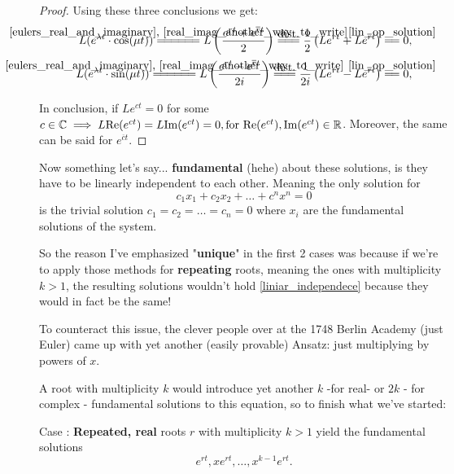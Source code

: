 \begin{proof}
	\newcommand\byDistributivity{\stackrel{\mathclap{\normalfont\mbox{dist.}}}{=\joinrel=\joinrel=}}

	\newcommand\operatorSatisfy{\stackrel{\mathclap{\normalfont\mbox{\ref{lin_op_solution}}}}{=\joinrel=}}

	Using these three conclusions we get:
	\begin{align*}
		L(e^{\lambda t} \cdot \text{cos}(\mu t)) \firstConclusion
		L\left(\frac{e^{rt}+e^{\overline{r}t}}{2} \right) \byDistributivity
		\frac{1}{2} \left( Le^{rt} + Le^{\overline{r}t} \right) \operatorSatisfy 0 , \\
		L(e^{\lambda t} \cdot \text{sin}(\mu t)) \firstConclusion
		L\left(\frac{e^{rt}-e^{\overline{r}t}}{2i} \right) \byDistributivity
		\frac{1}{2i} \left( Le^{rt} - Le^{\overline{r}t} \right) \operatorSatisfy 0 ,
	\end{align*}

	In conclusion, if $Le^{ct}=0$ for some $c \in \mathbb{C} \implies L\text{Re}(e^{ ct })= L\text{Im}(e^{ct})=0, \\
	\text{for } \text{Re}(e^{ct}), \text{Im}(e^{ct}) \in \mathbb{R}$.
	Moreover, the same can be said for $e^{\overline{c}t}$.
\end{proof}

Now something let's say... \textbf{fundamental} (hehe) about these solutions, is they have to be linearly independent to each other. Meaning the only solution for
\begin{equation}\label{liniar_independece}
	c_1 x_1+c_2 x_2 + \dots + c^n x^n = 0
\end{equation}
is the trivial solution $c_1=c_2=\dots=c_n=0$ where $x_i$ are the fundamental solutions of the system.

So the reason I've emphasized "\textbf{unique}" in the first 2 cases was because if we're to apply those methods for \textbf{repeating} roots, meaning the ones with multiplicity $k>1$, the resulting solutions wouldn't hold \ref{liniar_independece} because they would in fact be the same!

To counteract this issue, the clever people over at the 1748 Berlin Academy (just Euler) came up with yet another (easily provable) Ansatz: just multiplying by powers of $x$.

A root with multiplicity $k$ would introduce yet another $k$ -for real- or $2k$ - for complex - fundamental solutions to this equation, so to finish what we've started:

Case : \textbf{Repeated, real} roots $r$ with multiplicity $k>1$ yield the fundamental solutions
\[
	e^{rt}, xe^{rt}, \dots,x^{k-1}e^{rt}.
\]


